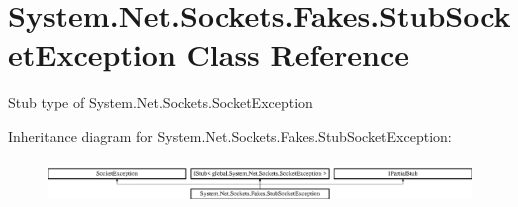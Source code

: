 \hypertarget{class_system_1_1_net_1_1_sockets_1_1_fakes_1_1_stub_socket_exception}{\section{System.\-Net.\-Sockets.\-Fakes.\-Stub\-Socket\-Exception Class Reference}
\label{class_system_1_1_net_1_1_sockets_1_1_fakes_1_1_stub_socket_exception}
}


Stub type of System.\-Net.\-Sockets.\-Socket\-Exception 


Inheritance diagram for System.\-Net.\-Sockets.\-Fakes.\-Stub\-Socket\-Exception\-:\begin{figure}[H]
\begin{center}
\leavevmode
\includegraphics[height=1.174004cm]{class_system_1_1_net_1_1_sockets_1_1_fakes_1_1_stub_socket_exception}
\end{center}
\end{figure}
